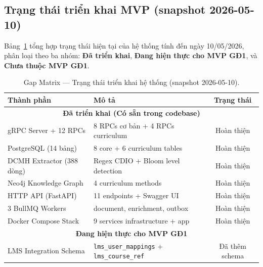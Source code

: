 \subsection{Trạng thái triển khai MVP (snapshot 2026-05-10)}

Bảng~\ref{tab:gap-matrix} tổng hợp trạng thái hiện tại của hệ thống tính
đến ngày 10/05/2026, phân loại theo ba nhóm: \textbf{Đã triển khai},
\textbf{Đang hiện thực cho MVP GĐ1}, và \textbf{Chưa thuộc MVP GĐ1}.

\begin{table}[H]
    \centering
    \caption{Gap Matrix --- Trạng thái triển khai hệ thống (snapshot 2026-05-10).}
    \label{tab:gap-matrix}
    \begin{tabular}{p{5.5cm}p{7cm}c}
        \toprule
        \textbf{Thành phần} & \textbf{Mô tả} & \textbf{Trạng thái} \\
        \midrule
        \multicolumn{3}{c}{\textbf{Đã triển khai (Có sẵn trong codebase)}} \\
        \midrule
        gRPC Server + 12 RPCs
            & 8 RPCs cơ bản + 4 RPCs curriculum
            & \cellcolor{green!20}Hoàn thiện \\
        \midrule
        PostgreSQL (14 bảng)
            & 8 core + 6 curriculum tables
            & \cellcolor{green!20}Hoàn thiện \\
        \midrule
        DCMH Extractor (388 dòng)
            & Regex CDIO + Bloom level detection
            & \cellcolor{green!20}Hoàn thiện \\
        \midrule
        Neo4j Knowledge Graph
            & 4 curriculum methods
            & \cellcolor{green!20}Hoàn thiện \\
        \midrule
        HTTP API (FastAPI)
            & 11 endpoints + Swagger UI
            & \cellcolor{green!20}Hoàn thiện \\
        \midrule
        3 BullMQ Workers
            & document, enrichment, outbox
            & \cellcolor{green!20}Hoàn thiện \\
        \midrule
        Docker Compose Stack
            & 9 services infrastructure + app
            & \cellcolor{green!20}Hoàn thiện \\
        \midrule
        \multicolumn{3}{c}{\textbf{Đang hiện thực cho MVP GĐ1}} \\
        \midrule
        LMS Integration Schema
            & \texttt{lms\_user\_mappings} + \texttt{lms\_course\_ref}
            & \cellcolor{yellow!20}Đã thêm schema \\

\end{tabular}
\end{table}
